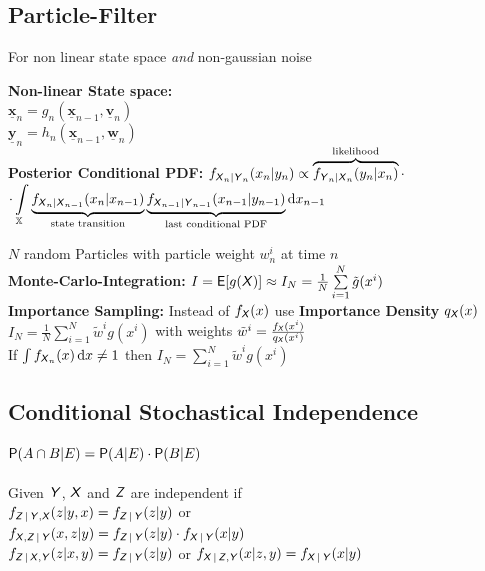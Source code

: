 \documentclass[english]{latex4ei/latex4ei_sheet}
\renewcommand{\vec}[1]{\underline{\boldsymbol{#1}}}
\begin{document}
\begin{sectionbox}
	\subsection{Particle-Filter}
	For non linear state space \emph{and} non-gaussian noise

	\textbf{Non-linear State space:}\\
	$\vec x_n = g_n(\vec x_{n−1}, \vec v_n)$\\
	$\vec y_n = h_n(\vec x_{n−1}, \vec w_n)$\\


	\textbf{Posterior Conditional PDF:} $f_{\X_n\!|\!\Y_n}(x_n|y_n) \propto \overbrace{ f_{\Y_n\!|\!\X_n}(y_n|x_n) }^{\text{likelihood}} \cdot$\\
	${ \displaystyle \cdot \int\limits_{\mathbb X} \underbrace{ f_{\X_n\!|\!\X_{n-1}}(x_n|x_{n-1}) }_{\text{state transition}} \underbrace{ f_{\X_{n-1}\!|\!\Y_{n-1}}(x_{n-1}|y_{n-1}) }_{\text{last conditional PDF}} \diff x_{n-1} }$


	$N$ random Particles with particle weight $w_n^i$ at time $n$\\
	\textbf{Monte-Carlo-Integration:}
	$I = \E[g(\X)] \approx I_N = \frac{1}{N} \sum\limits_{i=1}^{N} \tilde g(x^i)$\\
	\textbf{Importance Sampling:} Instead of $f_{\X}(x)$ use \textbf{Importance Density} $q_{\X}(x)$\\
	$I_N = \frac{1}{N} \sum\limits_{i=1}^{N} \tilde w^i g(x^i)$ with weights $\tilde w^i = \frac{f_{\X}(x^i)}{q_{\X}(x^i)}$\\
	If $\int f_{\X_n}(x) \diff x \ne 1$ then $I_N = \sum\limits_{i=1}^{N} \tilde w^i g(x^i)$\\
\end{sectionbox}

\begin{sectionbox}
	\subsection{Conditional Stochastical Independence}
	$\P(A \cap B | E) = \P(A | E) \cdot \P(B | E)$\\
	\\
	Given $\Y$, $\X$ and $\Z$ are independent if\\
	$f_{\Z|\Y,\X} (z | y, x) = f_{\Z|\Y}(z|y)$ or\\
	$f_{\X,\Z|\Y} (x,z|y) = f_{\Z|\Y}(z|y) \cdot f_{\X|\Y}(x|y)$\\
	$f_{\Z|\X,\Y}(z|x,y) = f_{\Z|\Y}(z|y)$ or $f_{\X|\Z,\Y}(x|z,y) = f_{\X|\Y}(x|y)$



\end{sectionbox}
\end{document}
